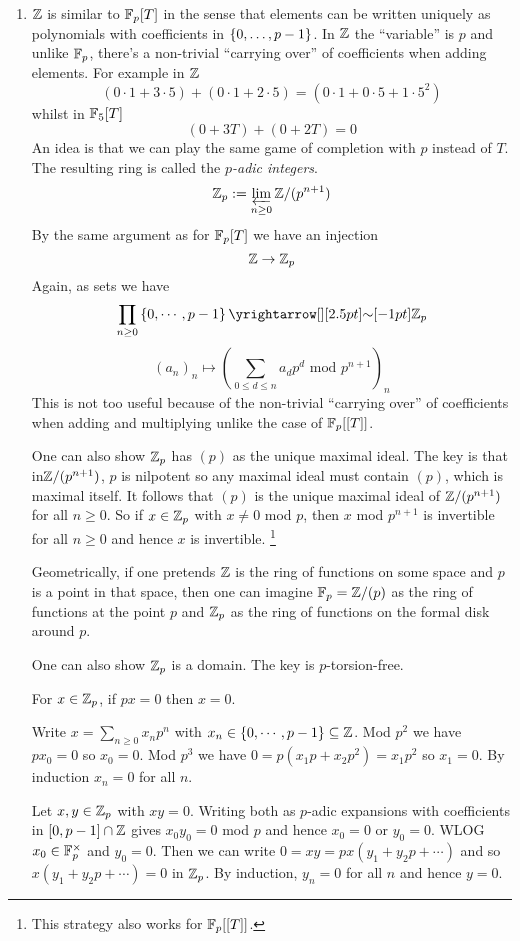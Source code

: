 \documentclass{article}
\begin{document}
\begin{enumerate}
  \item $\mathbb{Z}$ is similar to $\mathbb{F}_p[T]$ in the sense that
  elements can be written uniquely as 
  polynomials with coefficients in $\left\{0 , \dots , p - 1\right\}$.
  In $\mathbb{Z}$ the ``variable'' is $p$ and unlike $\mathbb{F}_p$,
  there's a non-trivial ``carrying over'' of coefficients
  when adding elements. For example in $\mathbb{Z}$
  \[
    (0 \cdot 1 + 3 \cdot 5) + 
    (0 \cdot 1 + 2 \cdot 5) = 
    (0 \cdot 1 + 0 \cdot 5 + 1 \cdot 5^2)
  \]
  whilst in $\mathbb{F}_5[T]$
  \[
    (0 + 3 T) +
    (0 + 2 T)
    = 0
  \]
  An idea is that we can play the same game of completion
  with $p$ instead of $T$.
  The resulting ring is called the \emph{$p$-adic integers}.
  \[
    \mathbb{Z}_p := \varprojlim_{n \geq 0} \mathbb{Z} / (p^{n+1})
  \]
  By the same argument as for $\mathbb{F}_p[T]$ we have an injection
  \[
    \mathbb{Z} \to \mathbb{Z}_p
  \]
  Again, as sets we have \[
    \prod_{n \geq 0} \set{0 , \cdots , p - 1}
    \map{\sim}{} \bZ_p
  \]
  \[
    (a_n)_n \mapsto (\sum_{0 \leq d \leq n} a_d p^d \text{ mod }p^{n+1})_n
  \]
  This is not too useful because of the non-trivial ``carrying over''
  of coefficients when adding and multiplying unlike the case of $\mathbb{F}_p[[T]]$.

  One can also show $\mathbb{Z}_p$ has $(p)$ as the unique maximal ideal.
  The key is that in$\mathbb{Z} / (p^{n+1})$,
  $p$ is nilpotent so any maximal ideal must contain $(p)$,
  which is maximal itself.
  It follows that $(p)$ is the unique maximal ideal of $\mathbb{Z} / (p^{n+1})$
  for all $n \geq 0$.
  So if $x \in \mathbb{Z}_p$ with $x \neq 0$ mod $p$,
  then $x$ mod $p^{n+1}$ is invertible for all $n \geq 0$
  and hence $x$ is invertible.
  \footnote{
    This strategy also works for $\mathbb{F}_p[[T]]$.
  }

  Geometrically, if one pretends $\mathbb{Z}$ is the ring of functions on some space
  and $p$ is a point in that space,
  then one can imagine $\mathbb{F}_p = \mathbb{Z} / (p)$ as
  the ring of functions at the point $p$ and
  $\mathbb{Z}_p$ as the ring of functions on the formal disk around $p$.

  One can also show $\mathbb{Z}_p$ is a domain.
  The key is $p$-torsion-free.
  \begin{lem}
    For $x \in \mathbb{Z}_p$, if $p x = 0$ then $x = 0$.

    \begin{proof1}
      Write $x = \sum_{n \geq 0} x_n p^n$ with 
      $x_n \in \left\{0 , \cdots , p - 1\right\} \subseteq \mathbb{Z}$.
      Mod $p^2$ we have $p x_0 = 0$ so $x_0 = 0$.
      Mod $p^3$ we have $0 = p(x_1 p + x_2 p^2) = x_1 p^2$ so $x_1 = 0$.
      By induction $x_n = 0$ for all $n$.
    \end{proof1}
  \end{lem}
  Let $x , y \in \mathbb{Z}_p$ with $x y = 0$.
  Writing both as $p$-adic expansions with coefficients in $[0 , p-1] \cap \mathbb{Z}$
  gives $x_0 y_0 = 0$ mod $p$ and hence $x_0 = 0$ or $y_0 = 0$.
  WLOG $x_0 \in \mathbb{F}_p^\times$ and $y_0 = 0$.
  Then we can write $0 = x y = p x (y_1 + y_2 p + \cdots)$
  and so $x (y_1 + y_2 p + \cdots) = 0$ in $\mathbb{Z}_p$.
  By induction, $y_n = 0$ for all $n$ and hence $y = 0$.


\end{enumerate}
\end{document}

